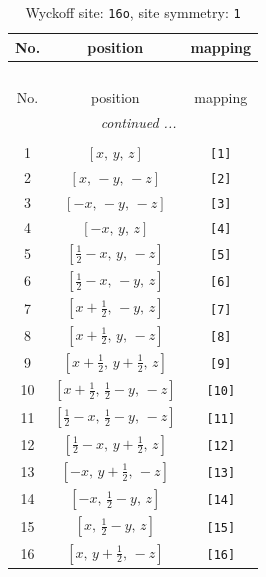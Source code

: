 \documentclass[fleqn,8pt]{jsarticle}
\begin{document}
\begin{longtable}{ccc}
\caption{Wyckoff site: {\tt 16o}, site symmetry: {\tt 1}}
 \\
 \hline \hline
No. & position & mapping \\ \hline \endfirsthead

\multicolumn{2}{l}{\tablename\ \thetable{}} \\
 \hline \hline
No. & position & mapping \\ \hline \endhead

 \hline \hline
\multicolumn{2}{r}{\footnotesize\it continued ...} \\ \endfoot

 \hline \hline
\multicolumn{2}{r}{} \\ \endlastfoot

1 & $\left[ x,\, y,\, z \right]$ & {\tt [1]} \\ \hline
2 & $\left[ x,\, - y,\, - z \right]$ & {\tt [2]} \\ \hline
3 & $\left[ - x,\, - y,\, - z \right]$ & {\tt [3]} \\ \hline
4 & $\left[ - x,\, y,\, z \right]$ & {\tt [4]} \\ \hline
5 & $\left[ \frac{1}{2} - x,\, y,\, - z \right]$ & {\tt [5]} \\ \hline
6 & $\left[ \frac{1}{2} - x,\, - y,\, z \right]$ & {\tt [6]} \\ \hline
7 & $\left[ x + \frac{1}{2},\, - y,\, z \right]$ & {\tt [7]} \\ \hline
8 & $\left[ x + \frac{1}{2},\, y,\, - z \right]$ & {\tt [8]} \\ \hline
9 & $\left[ x + \frac{1}{2},\, y + \frac{1}{2},\, z \right]$ & {\tt [9]} \\ \hline
10 & $\left[ x + \frac{1}{2},\, \frac{1}{2} - y,\, - z \right]$ & {\tt [10]} \\ \hline
11 & $\left[ \frac{1}{2} - x,\, \frac{1}{2} - y,\, - z \right]$ & {\tt [11]} \\ \hline
12 & $\left[ \frac{1}{2} - x,\, y + \frac{1}{2},\, z \right]$ & {\tt [12]} \\ \hline
13 & $\left[ - x,\, y + \frac{1}{2},\, - z \right]$ & {\tt [13]} \\ \hline
14 & $\left[ - x,\, \frac{1}{2} - y,\, z \right]$ & {\tt [14]} \\ \hline
15 & $\left[ x,\, \frac{1}{2} - y,\, z \right]$ & {\tt [15]} \\ \hline
16 & $\left[ x,\, y + \frac{1}{2},\, - z \right]$ & {\tt [16]} \\
\end{longtable}
\end{document}
